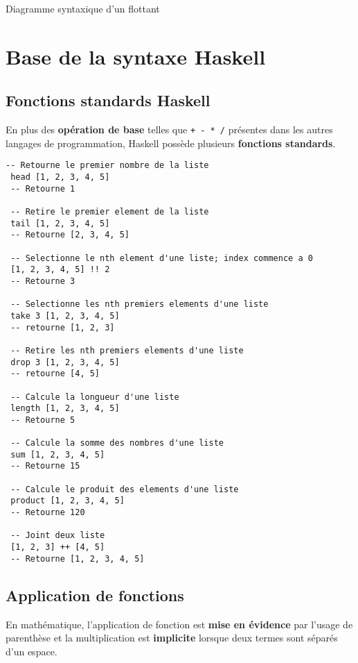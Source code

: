 \documentclass{report}
\begin{document}
\begin{multicols*}{3}
\begin{EExample}{Diagramme syntaxique d'un flottant}{}
\begin{adjustbox}{width=\linewidth}
\begin{tikzpicture}[shorten >=1pt, node distance=2cm, on grid, auto]
     \end{tikzpicture}
  \end{adjustbox}
\end{EExample}


\chapter{Base de la syntaxe Haskell}

\vspace{-2em}
\section{Fonctions standards Haskell}
En plus des \textbf{opération de base} telles que \texttt{+ - * /} présentes 
dans les autres langages de programmation, Haskell possède 
plusieurs \textbf{fonctions standards}.  
\begin{EExample}{}{}
  \begin{lstlisting}[style=DraculaWhiteHaskell]
 -- Retourne le premier nombre de la liste 
 head [1, 2, 3, 4, 5]  
 -- Retourne 1

 -- Retire le premier element de la liste 
 tail [1, 2, 3, 4, 5] 
 -- Retourne [2, 3, 4, 5]

 -- Selectionne le nth element d'une liste; index commence a 0 
 [1, 2, 3, 4, 5] !! 2 
 -- Retourne 3 

 -- Selectionne les nth premiers elements d'une liste 
 take 3 [1, 2, 3, 4, 5] 
 -- retourne [1, 2, 3]

 -- Retire les nth premiers elements d'une liste 
 drop 3 [1, 2, 3, 4, 5] 
 -- retourne [4, 5]

 -- Calcule la longueur d'une liste 
 length [1, 2, 3, 4, 5] 
 -- Retourne 5 

 -- Calcule la somme des nombres d'une liste 
 sum [1, 2, 3, 4, 5] 
 -- Retourne 15

 -- Calcule le produit des elements d'une liste 
 product [1, 2, 3, 4, 5]
 -- Retourne 120 

 -- Joint deux liste 
 [1, 2, 3] ++ [4, 5] 
 -- Retourne [1, 2, 3, 4, 5]
  \end{lstlisting}
\end{EExample}

\section{Application de fonctions}
En mathématique, l'application de fonction est 
\textbf{mise en évidence} par l'usage de parenthèse 
et la multiplication est \textbf{implicite} lorsque deux termes 
sont séparés d'un espace.



\end{multicols*}
\end{document}
